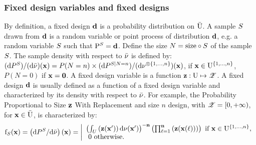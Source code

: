 \subsubsection{Fixed  design variables and fixed designs}
By definition, a fixed design $\mathbf{d}$ is a probability distribution on $\bar{\mathrm{U}}$.
A sample $S$ drawn from $\mathbf{d}$ is a random variable or point process of distribution $\mathbf{d}$, e.g. a random variable $S$ such that $\mathrm{P}^S=\mathbf{d}$. 
Define the size $N=\mathrm{size}\circ S$ of the sample $S$. The sample density with respect to $\bar{\nu}$ is defined by:
$(\mathrm{d} P^S)/(\mathrm{d}\bar{\nu})(\mathbf{x})=P(N=n)\times(\mathrm{d} P^{S\mid N=n})/(\mathrm{d}\nu^{\otimes\{1,\ldots,n\}})(\mathbf{x})$, if $\mathbf{x}\in\mathrm{U}^{\{1,\ldots,n\}}$, $P(N=0)$ if $\mathbf{x}=\mathbf{0}$. 
A fixed design variable is a function $\mathbf{z}:\mathrm{U}\mapsto \mathscr{Z}$.
A fixed  design $\mathbf{d}$ is usually defined as a function of a fixed design variable and characterized by its density with respect to $\bar{\nu}$. For example, the Probability Proportional to Size $\mathbf{z}$ With Replacement and size $n$ design, with $\mathscr{Z}=[0,+\infty)$, for $\mathbf{x}\in \bar{\mathrm{U}}$, is characterized by:  
\begin{equation}\label{eq:ppswr}\mathrm{f}_{S}(\mathbf{x})=\left(\mathrm{d} P^{S}/\mathrm{d}\bar{\nu}\right)(\mathbf{x})=\left|\begin{array}{l}\left(\int_U \left(\mathbf{z}(\mathbf{x}')\right)\mathrm{d}\nu (\mathbf{x}')\right)^{-\mathbf{n}}
\left(\prod_{\ell=1}^{\mathbf{n}}\left(\mathbf{z}(\mathbf{x}(\ell))\right)\right)\text{ if }\mathbf{x}\in\mathrm{U}^{\{1,\ldots,n\}},\\~0\text{ otherwise.}
\end{array}\right.\end{equation}

